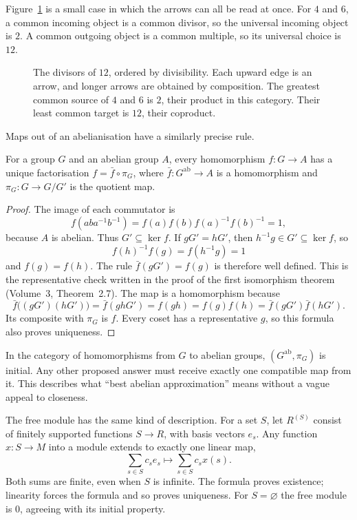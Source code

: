 Figure~\ref{fig:v10new-ch01-divisors} is a small case in which the arrows can all be read at once. For $4$ and $6$, a common incoming object is a common divisor, so the universal incoming object is $2$. A common outgoing object is a common multiple, so its universal choice is $12$.

\begin{figure}[ht]
\centering
{}
\caption{The divisors of $12$, ordered by divisibility. Each upward edge is an arrow, and longer arrows are obtained by composition. The greatest common source of $4$ and $6$ is $2$, their product in this category. Their least common target is $12$, their coproduct.}
\label{fig:v10new-ch01-divisors}
\end{figure}

Maps out of an abelianisation have a similarly precise rule.

\begin{proposition}\label{prop:abuniv}
For a group $G$ and an abelian group $A$, every homomorphism $f:G\to A$ has a unique factorisation $f=\bar f\circ\pi_G$, where $\bar f:G^{\mathrm{ab}}\to A$ is a homomorphism and $\pi_G:G\to G/G'$ is the quotient map.
\end{proposition}

\begin{proof}
The image of each commutator is
\[
f(aba^{-1}b^{-1})=f(a)f(b)f(a)^{-1}f(b)^{-1}=1,
\]
because $A$ is abelian. Thus $G'\subseteq\ker f$. If $gG'=hG'$, then $h^{-1}g\in G'\subseteq\ker f$, so
\[
f(h)^{-1}f(g)=f(h^{-1}g)=1
\]
and $f(g)=f(h)$. The rule $\bar f(gG')=f(g)$ is therefore well defined. This is the representative check written in the proof of the first isomorphism theorem (Volume~3, Theorem~2.7). The map is a homomorphism because
\[
\bar f\bigl((gG')(hG')\bigr)=\bar f(ghG')=f(gh)=f(g)f(h)=\bar f(gG')\bar f(hG').
\]
Its composite with $\pi_G$ is $f$. Every coset has a representative $g$, so this formula also proves uniqueness.
\end{proof}

In the category of homomorphisms from $G$ to abelian groups, $(G^{\mathrm{ab}},\pi_G)$ is initial. Any other proposed answer must receive exactly one compatible map from it. This describes what ``best abelian approximation'' means without a vague appeal to closeness.

The free module has the same kind of description. For a set $S$, let $R^{(S)}$ consist of finitely supported functions $S\to R$, with basis vectors $e_s$. Any function $x:S\to M$ into a module extends to exactly one linear map,
\[
\sum_{s\in S}c_se_s\longmapsto\sum_{s\in S}c_sx(s).
\]
Both sums are finite, even when $S$ is infinite. The formula proves existence; linearity forces the formula and so proves uniqueness. For $S=\varnothing$ the free module is $0$, agreeing with its initial property.

